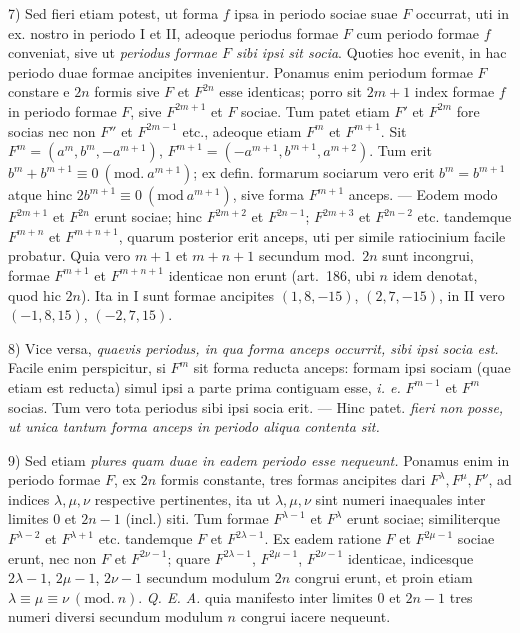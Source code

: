 7) Sed fieri etiam potest, ut forma $f$ ipsa in periodo sociae suae $F$ occurrat, uti in ex. nostro in periodo I et II, adeoque periodus formae $F$ cum periodo formae $f$ conveniat, sive ut \textit{periodus formae $F$ sibi ipsi sit socia}. Quoties hoc evenit, in hac periodo duae formae ancipites invenientur. Ponamus enim periodum formae $F$ constare e $2n$ formis sive $F$ et $F^{2n}$ esse identicas; porro sit $2m+1$ index formae $f$ in periodo formae $F$, sive $F^{2m+1}$ et $F$ sociae. Tum patet etiam $F'$ et $F^{2m}$ fore socias nec non $F''$ et $F^{2m-1}$ etc., adeoque etiam $F^m$ et $F^{m+1}$. Sit $F^m=(a^m,b^m,-a^{m+1})$, $F^{m+1}=(-a^{m+1},b^{m+1},a^{m+2})$. Tum erit $b^m+b^{m+1}\equiv0\ (\mathrm{mod.}\ a^{m+1})$; ex defin. formarum sociarum vero erit $b^m=b^{m+1}$ atque hinc $2b^{m+1}\equiv0\ (\mathrm{mod}\ a^{m+1})$, sive forma $F^{m+1}$ anceps. --- Eodem modo $F^{2m+1}$ et $F^{2n}$ erunt sociae; hinc $F^{2m+2}$ et $F^{2n-1}$; $F^{2m+3}$ et $F^{2n-2}$ etc. tandemque $F^{m+n}$ et $F^{m+n+1}$, quarum posterior erit anceps, uti per simile ratiocinium facile probatur. Quia vero $m+1$ et $m+n+1$ secundum mod.~$2n$ sunt incongrui, formae $F^{m+1}$ et $F^{m+n+1}$ identicae non erunt (art.~186, ubi $n$ idem denotat, quod hic $2n$). Ita in I sunt formae ancipites $(1,8,-15)$, $(2,7,-15)$, in II vero $(-1,8,15)$, $(-2,7,15)$.

8) Vice versa, \textit{quaevis periodus, in qua forma anceps occurrit, sibi ipsi socia est.} Facile enim perspicitur, si $F^m$ sit forma reducta anceps: formam ipsi sociam (quae etiam est reducta) simul ipsi a parte prima contiguam esse, \textit{i. e.} $F^{m-1}$ et $F^m$ socias. Tum vero tota periodus sibi ipsi socia erit. --- {Hinc patet.} \textit{fieri non posse, ut unica tantum forma anceps in periodo aliqua contenta sit.}

9) Sed etiam \textit{plures quam duae in eadem periodo esse nequeunt.} Ponamus enim in periodo formae $F$, ex $2n$ formis constante, tres formas ancipites dari $F^\lambda,F^\mu,F^\nu$, ad indices $\lambda,\mu,\nu$ respective pertinentes, ita ut $\lambda,\mu,\nu$ sint numeri inaequales inter limites $0$ et $2n-1$ (incl.) siti. Tum formae $F^{\lambda-1}$ et $F^\lambda$ erunt sociae; similiterque $F^{\lambda-2}$ et $F^{\lambda+1}$ etc. tandemque $F$ et $F^{2\lambda-1}$. Ex eadem ratione $F$ et $F^{2\mu-1}$ sociae erunt, nec non $F$ et $F^{2\nu-1}$; quare $F^{2\lambda-1}$, $F^{2\mu-1}$, $F^{2\nu-1}$ identicae, indicesque $2\lambda-1$, $2\mu-1$, $2\nu-1$ secundum modulum $2n$ congrui erunt, et proin etiam $\lambda\equiv\mu\equiv\nu\ (\mathrm{mod.}\ n)$. \textit{Q. E. A.} quia manifesto inter limites $0$ et $2n-1$ tres numeri diversi secundum modulum $n$ congrui iacere nequeunt.

